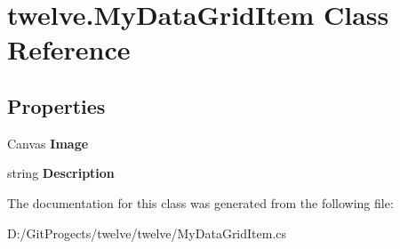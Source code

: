 \hypertarget{classtwelve_1_1_my_data_grid_item}{}\section{twelve.\+My\+Data\+Grid\+Item Class Reference}
\label{classtwelve_1_1_my_data_grid_item}
\subsection*{Properties}
\begin{DoxyCompactItemize}
\item 
\hypertarget{classtwelve_1_1_my_data_grid_item_ab81c03c19d638f1069228fefc718ef09}{}Canvas {\bfseries Image}\label{classtwelve_1_1_my_data_grid_item_ab81c03c19d638f1069228fefc718ef09}

\item 
\hypertarget{classtwelve_1_1_my_data_grid_item_a42b788fffd89b383429f1f60f67e1045}{}string {\bfseries Description}\label{classtwelve_1_1_my_data_grid_item_a42b788fffd89b383429f1f60f67e1045}

\end{DoxyCompactItemize}


The documentation for this class was generated from the following file\+:\begin{DoxyCompactItemize}
\item 
D\+:/\+Git\+Progects/twelve/twelve/My\+Data\+Grid\+Item.\+cs\end{DoxyCompactItemize}
